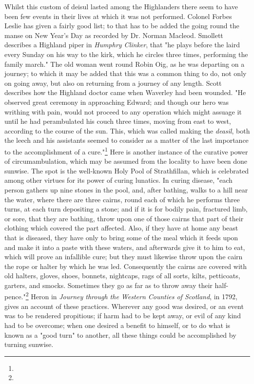 \documentclass[a4paper, 11pt, oneside, polutonikogreek, english]{article}
\begin{document}
Whilst this custom of deisul lasted among the Highlanders there seem to have been few events in their lives at which it was not performed. Colonel Forbes Leslie has given a fairly good list; to that has to be added the going round the manse on New Year's Day as recorded by Dr. Norman Macleod. Smollett describes a Highland piper in \emph{Humphry Clinker}, that "he plays before the laird every Sunday on his way to the kirk, which he circles three times, performing the family march." The old woman went round Robin Oig, as he was departing on a journey; to which it may be added that this was a common thing to do, not only on going away, but also on returning from a journey of any length. Scott describes how the Highland doctor came when Waverley had been wounded. "He observed great ceremony in approaching Edward; and though our hero was writhing with pain, would not proceed to any operation which might assuage it until he had perambulated his couch three times, moving from east to west, according to the course of the sun. This, which was called making the \emph{deasil}, both the leech and his assistants seemed to consider as a matter of the last importance to the accomplishment of a cure."\footnote{} Here is another instance of the curative power of circumambulation, which may be assumed from the locality to have been done sunwise. The spot is the well-known Holy Pool of Strathfillan, which is celebrated among other virtues for its power of curing lunatics. In curing disease, "each person gathers up nine stones in the pool, and, after bathing, walks to a hill near the water, where there are three cairns, round each of which he performs three turns, at each turn depositing a stone; and if it is for bodily pain, fractured limb, or sore, that they are bathing, throw upon one of those cairns that part of their clothing which covered the part affected. Also, if they have at home any beast that is diseased, they have only to bring some of the meal which it feeds upon and make it into a paste with these waters, and afterwards give it to him to eat, which will prove an infallible cure; but they must likewise throw upon the cairn the rope or halter by which he was led. Consequently the cairns are covered with old halters, gloves, shoes, bonnets, nightcaps, rags of all sorts, kilts, petticoats, garters, and smocks. Sometimes they go as far as to throw away their half-pence."\footnote{} Heron in \emph{Journey through the Western Counties of Scotland}, in 1792, gives an account of these practices. Wherever any good was desired, or an event was to be rendered propitious; if harm had to be kept away, or evil of any kind had to be overcome; when one desired a benefit to himself, or to do what is known as a "good turn" to another, all these things could be accomplished by turning sunwise.
\end{document}
